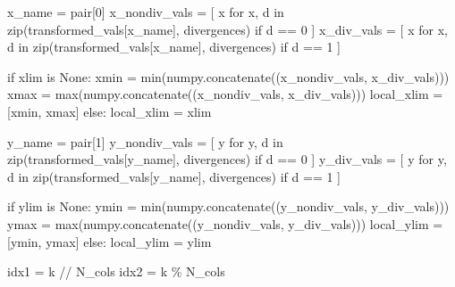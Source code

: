 \documentclass[
  letterpaper,
  DIV=11,
  numbers=noendperiod]{scrartcl}
\newenvironment{Shaded}{\begin{snugshade}}{\end{snugshade}}
\newcommand{\BuiltInTok}[1]{\textcolor[rgb]{0.00,0.23,0.31}{#1}}
\newcommand{\ControlFlowTok}[1]{\textcolor[rgb]{0.00,0.23,0.31}{#1}}
\newcommand{\DecValTok}[1]{\textcolor[rgb]{0.68,0.00,0.00}{#1}}
\newcommand{\KeywordTok}[1]{\textcolor[rgb]{0.00,0.23,0.31}{#1}}
\newcommand{\NormalTok}[1]{\textcolor[rgb]{0.00,0.23,0.31}{#1}}
\newcommand{\OperatorTok}[1]{\textcolor[rgb]{0.37,0.37,0.37}{#1}}
\newcommand{\VariableTok}[1]{\textcolor[rgb]{0.07,0.07,0.07}{#1}}
\begin{document}
\begin{Shaded}
\begin{Highlighting}[]
\NormalTok{    x\_name }\OperatorTok{=}\NormalTok{ pair[}\DecValTok{0}\NormalTok{]}
\NormalTok{    x\_nondiv\_vals }\OperatorTok{=}\NormalTok{ [ x }\ControlFlowTok{for}\NormalTok{ x, d }\KeywordTok{in}
                      \BuiltInTok{zip}\NormalTok{(transformed\_vals[x\_name], divergences)}
                      \ControlFlowTok{if}\NormalTok{ d }\OperatorTok{==} \DecValTok{0}\NormalTok{  ]}
\NormalTok{    x\_div\_vals    }\OperatorTok{=}\NormalTok{ [ x }\ControlFlowTok{for}\NormalTok{ x, d }\KeywordTok{in}
                      \BuiltInTok{zip}\NormalTok{(transformed\_vals[x\_name], divergences)}
                      \ControlFlowTok{if}\NormalTok{ d }\OperatorTok{==} \DecValTok{1}\NormalTok{  ]}

    \ControlFlowTok{if}\NormalTok{ xlim }\KeywordTok{is} \VariableTok{None}\NormalTok{:}
\NormalTok{      xmin }\OperatorTok{=} \BuiltInTok{min}\NormalTok{(numpy.concatenate((x\_nondiv\_vals, x\_div\_vals)))}
\NormalTok{      xmax }\OperatorTok{=} \BuiltInTok{max}\NormalTok{(numpy.concatenate((x\_nondiv\_vals, x\_div\_vals)))}
\NormalTok{      local\_xlim }\OperatorTok{=}\NormalTok{ [xmin, xmax]}
    \ControlFlowTok{else}\NormalTok{:}
\NormalTok{      local\_xlim }\OperatorTok{=}\NormalTok{ xlim}

\NormalTok{    y\_name }\OperatorTok{=}\NormalTok{ pair[}\DecValTok{1}\NormalTok{]}
\NormalTok{    y\_nondiv\_vals }\OperatorTok{=}\NormalTok{ [ y }\ControlFlowTok{for}\NormalTok{ y, d }\KeywordTok{in}
                      \BuiltInTok{zip}\NormalTok{(transformed\_vals[y\_name], divergences)}
                      \ControlFlowTok{if}\NormalTok{ d }\OperatorTok{==} \DecValTok{0}\NormalTok{  ]}
\NormalTok{    y\_div\_vals    }\OperatorTok{=}\NormalTok{ [ y }\ControlFlowTok{for}\NormalTok{ y, d }\KeywordTok{in}
                      \BuiltInTok{zip}\NormalTok{(transformed\_vals[y\_name], divergences)}
                      \ControlFlowTok{if}\NormalTok{ d }\OperatorTok{==} \DecValTok{1}\NormalTok{  ]}

    \ControlFlowTok{if}\NormalTok{ ylim }\KeywordTok{is} \VariableTok{None}\NormalTok{:}
\NormalTok{      ymin }\OperatorTok{=} \BuiltInTok{min}\NormalTok{(numpy.concatenate((y\_nondiv\_vals, y\_div\_vals)))}
\NormalTok{      ymax }\OperatorTok{=} \BuiltInTok{max}\NormalTok{(numpy.concatenate((y\_nondiv\_vals, y\_div\_vals)))}
\NormalTok{      local\_ylim }\OperatorTok{=}\NormalTok{ [ymin, ymax]}
    \ControlFlowTok{else}\NormalTok{:}
\NormalTok{      local\_ylim }\OperatorTok{=}\NormalTok{ ylim}

\NormalTok{    idx1 }\OperatorTok{=}\NormalTok{ k }\OperatorTok{//}\NormalTok{ N\_cols}
\NormalTok{    idx2 }\OperatorTok{=}\NormalTok{ k }\OperatorTok{\%}\NormalTok{ N\_cols}


\end{Highlighting}
\end{Shaded}
\end{document}

